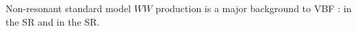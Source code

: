 
Non-resonant standard model $WW$ production is a major background to
VBF \hww:  in the \emme SR and  in
the \eemm SR. 
